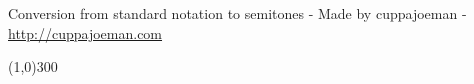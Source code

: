 \documentclass[pstricks]{amsart}
\author{cuppajoeman}
\begin{document}
Conversion from standard notation to semitones - Made by cuppajoeman - \url{http://cuppajoeman.com}

\vspace{.15cm}


\begin{center}
\end{center}

\vspace{.30cm}
\begin{center}
  \line(1,0){300}
\end{center}
\vspace{.30cm}
\end{document}
